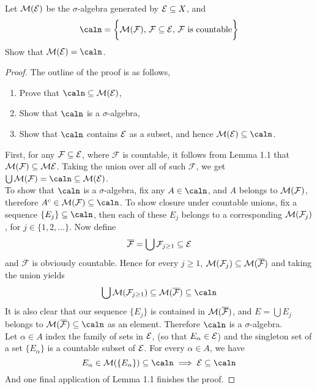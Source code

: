 \documentclass[../../main.tex]{subfiles}
\begin{document}
\begin{wts}
    Let $\mathcal{M}(\mathcal{E})$ be the $\sigma$-algebra generated by $\mathcal{E}\subseteq X$, and 
    \[
    \caln =\biggl\{\calm (\mathcal{F}),\, \mathcal{F}\subseteq \Epsilon,\, \mathcal{F} \text{ is countable}\biggr\}
    \]
    Show that $\calm(\Epsilon) = \caln$.
\end{wts}
\begin{proof}
    The outline of the proof is as follows,
    \begin{enumerate}
        \item Prove that $\caln \subseteq \calm(\Epsilon)$,
        \item Show that $\caln$ is a $\sigma$-algebra,
        \item Show that $\caln$ contains $\mathcal{E}$ as a subset, and hence $\calm(\Epsilon)\subseteq \caln$.
    \end{enumerate}
    First, for any $\mathcal{F}\subseteq \mathcal{E}$, where $\mathcal{F}$ is countable, it follows from Lemma 1.1 that $\mathcal{M}(\mathcal{F})\subseteq\mathcal{M}{\mathcal{E}}$. Taking the union over all of such $\mathcal{F}$, we get $\bigcup \mathcal{M}(\mathcal{F})=\caln\subseteq \mathcal{M}(\Epsilon)$.\\
    
    To show that $\caln$ is a $\sigma$-algebra, fix any $A\in \caln$, and $A$ belongs to $\mathcal{M}(\mathcal{F})$, therefore $A^c\in\calm(\mathcal{F})\subseteq \caln$. To show closure under countable unions, fix a sequence $\{E_j\}\subseteq\caln$, then each of these $E_j$ belongs to a corresponding $\mathcal{M}(\mathcal{F}_j)$, for $j\in \{1,2,\ldots\}$. Now define 
    \[
    \overline{\mathcal{F}} = \bigcup \mathcal{F}_{j\geq 1}\subseteq \mathcal{E}
    \]
    and $\overline{\mathcal{F}}$ is obviously countable. Hence for every $j\geq 1$, $\mathcal{M}(\mathcal{F}_j)\subseteq \mathcal{M}(\overline{\mathcal{F}})$ and taking the union yields
    \[
    \bigcup \calm(\mathcal{F}_{j\geq 1})\subseteq \calm (\overline{\mathcal{F}})\subseteq \caln
    \]
    It is also clear that our sequence $\{E_j\}$ is contained in $\mathcal{M}(\overline{\mathcal{F}})$, and $E=\bigcup E_j$ belongs to $\calm(\overline{\mathcal{F}})\subseteq\caln$ as an element. Therefore $\caln$ is a $\sigma$-algebra.\\
    
    Let $\alpha\in A$ index the family of sets in $\mathcal{E}$, (so that $E_\alpha\in\mathcal{E}$) and the singleton set of a set $\{E_\alpha\}$ is a countable subset of $\mathcal{E}$. For every $\alpha\in A$, we have
    \[
    E_\alpha\in\calm(\{E_\alpha\})\subseteq\caln\implies \Epsilon\subseteq\caln
    \]
    And one final application of Lemma 1.1 finishes the proof.
\end{proof}
\newpage
\end{document}
